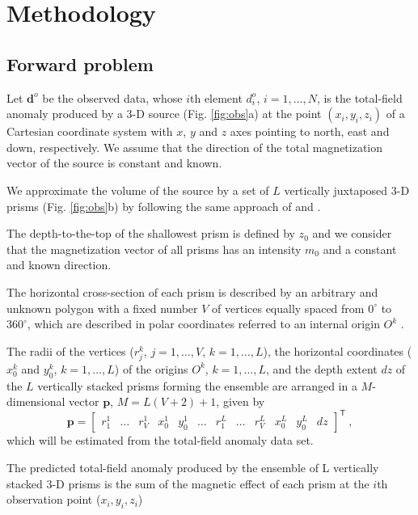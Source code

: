 \section{Methodology}\label{sec:metodo}

\subsection{Forward problem}

Let $\mathbf{d}^{o}$ be the observed data, whose $i$th element $d^{o}_{i}$, $i = 1, \dots, N$, is the total-field anomaly 
produced by a 3-D source (Fig. \ref{fig:obs}a) at the point $(x_{i}, y_{i}, z_{i})$ of a Cartesian coordinate 
system with $x$, $y$ and $z$ axes pointing to north, east and down, respectively. We assume that the direction of the total magnetization 
vector of the source is constant and known. 

We approximate the volume of the source by a set of $L$ vertically juxtaposed 3-D prisms 
(Fig. \ref{fig:obs}b) by following the same approach of \citet{oliveirajr-etal2011} and \citet{oliveirajr-barbosa2013}. 

The depth-to-the-top of the shallowest prism is defined by $z_{0}$ and we consider that the magnetization vector of all prisms 
has an intensity $m_{0}$ and a constant and known direction. 

The horizontal cross-section of each prism is described by an arbitrary and unknown polygon with a fixed number 
$V$ of vertices equally spaced from $0^{\circ}$ to $360^{\circ}$, which are described in polar coordinates 
referred to an internal origin $O^{k}$ . 

The radii of the vertices ($r^{k}_{j}$, $j=1,\dots , V$, $k=1,\dots ,L$), the horizontal coordinates ($x_{0}^{k}$ and $y_{0}^{k}$, $k=1,\dots ,L$) 
of the origins $O^{k}$, $k=1,\dots ,L$, and the depth extent $dz$ of the $L$ vertically stacked prisms forming the ensemble are arranged in a 
$M$-dimensional vector $\mathbf{p}$, $M = L (V + 2) + 1$, given by
\begin{equation}
\mathbf{p} = \begin{bmatrix}
r_{1}^{1} & \dots & r_{V}^{1} & x_{0}^{1} & y_{0}^{1} & \dots & r_{1}^{L} & \dots & r_{V}^{L} & x_{0}^{L} & y_{0}^{L} & dz 
\end{bmatrix}^{\mathsf{T}} \: ,
\end{equation}
which will be estimated from the total-field anomaly data set.

The predicted total-field anomaly produced by the ensemble of L vertically stacked 3-D prisms is the sum of the magnetic effect of each prism at the $i$th observation point ($x_i, y_i, z_i$)

